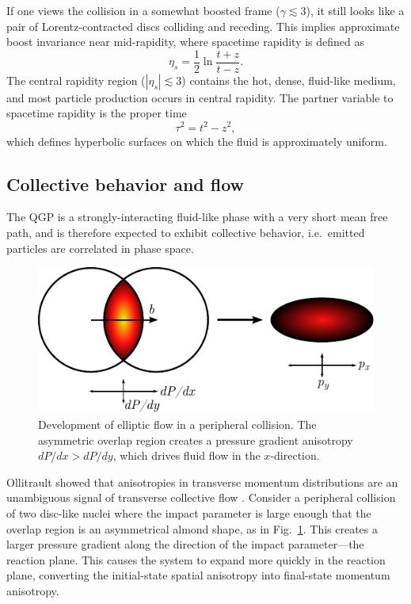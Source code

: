 \documentclass[reprint,amsmath]{revtex4-1}
\begin{document}
If one views the collision in a somewhat boosted frame ($\gamma \lesssim 3$), it still looks like a pair of Lorentz-contracted discs
colliding and receding.  This implies approximate boost invariance near mid-rapidity, where spacetime rapidity is defined as
\begin{equation}
  \eta_s = \frac{1}{2} \ln \frac{t + z}{t - z}.
\end{equation}
The central rapidity region ($|\eta_s| \lesssim 3$) contains the hot, dense, fluid-like medium, and most particle production occurs in
central rapidity.  The partner variable to spacetime rapidity is the proper time
\begin{equation}
  \tau^2 = t^2 - z^2,
\end{equation}
which defines hyperbolic surfaces on which the fluid is approximately uniform.


\subsection{Collective behavior and flow}

The QGP is a strongly-interacting fluid-like phase with a very short mean free path, and is therefore expected to exhibit collective
behavior, i.e.\ emitted particles are correlated in phase space.

\begin{figure}[b]
  \centering
  \includegraphics{ellipticflow}
  \caption{Development of elliptic flow in a peripheral collision.  The asymmetric overlap region creates a pressure gradient anisotropy
    $dP/dx > dP/dy$, which drives fluid flow in the $x$-direction.}
  \label{fig:peripheral}
\end{figure}

Ollitrault showed that anisotropies in transverse momentum distributions are an unambiguous signal of transverse collective flow
\cite{ollitrault}.  Consider a peripheral collision of two disc-like nuclei where the impact parameter is large enough that the overlap
region is an asymmetrical almond shape, as in Fig.\ \ref{fig:peripheral}.  This creates a larger pressure gradient along the direction of
the impact parameter---the reaction plane.  This causes the system to expand more quickly in the reaction plane, converting the
initial-state spatial anisotropy into final-state momentum anisotropy.
\end{document}
